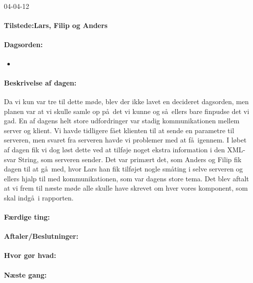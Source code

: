 \documentclass[a4paper,10pt,titlepage]{article}
\begin{document}
		\begin{center}
		04-04-12
		\end{center}
		
		\paragraph{Tilstede:Lars, Filip og Anders}
		\paragraph{Dagsorden:}
		\begin{itemize}
					\item 
					
		\end{itemize}
		
		\paragraph{Beskrivelse af dagen:}
		Da vi kun var tre til dette m\o de, blev der ikke lavet en decideret dagsorden, men planen var at vi skulle samle op p\aa \ det vi kunne og s\aa \ ellers bare finpudse det vi gad. En af dagens helt store udfordringer var stadig kommunikationen mellem server og klient. Vi havde tidligere f\aa et klienten til at sende en parametre til serveren, men svaret fra serveren havde vi problemer med at f\aa \ igennem. I l\o bet af dagen fik vi dog l\o st dette ved at tilf\o je noget ekstra information i den XML-svar String, som serveren sender. Det var prim\ae rt det, som Anders og Filip fik dagen til at g\aa \ med, hvor Lars han fik tilf\o jet nogle sm\aa ting i selve serveren og ellers hjalp til med kommunikationen, som var dagens store tema. Det blev aftalt at vi frem til n\ae ste m\o de alle skulle have skrevet om hver vores komponent, som skal indg\aa \ i rapporten. 
		\paragraph{F\ae rdige ting:}
		
		\paragraph{Aftaler/Beslutninger:}
		
		\paragraph{Hvor g\o r hvad:}
		
		\paragraph{N\ae ste gang:}\mbox{}\\
		
\end{document}
